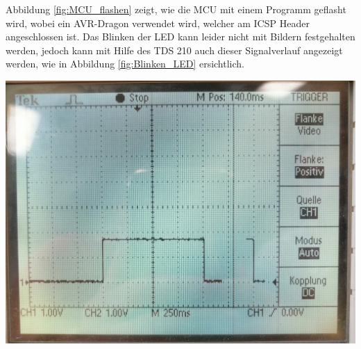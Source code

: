 {\begin{minipage}[b][7cm][t]{0.49\textwidth}
Abbildung \ref{fig:MCU_flashen} zeigt, wie die MCU mit einem Programm geflasht wird, wobei ein AVR-Dragon verwendet wird, welcher am ICSP Header angeschlossen ist. Das Blinken der LED kann leider nicht mit Bildern festgehalten werden, jedoch kann mit Hilfe des TDS 210 auch dieser Signalverlauf angezeigt werden, wie in Abbildung \ref{fig:Blinken_LED} ersichtlich.
\end{minipage}}
{\begin{minipage}[b][7cm][t]{0.49\textwidth}
\centering
\includegraphics[width=0.9\linewidth]{graphics/HW_Val/Blinken_LED.jpg}
\label{fig:Blinken_LED}
\end{minipage}}

